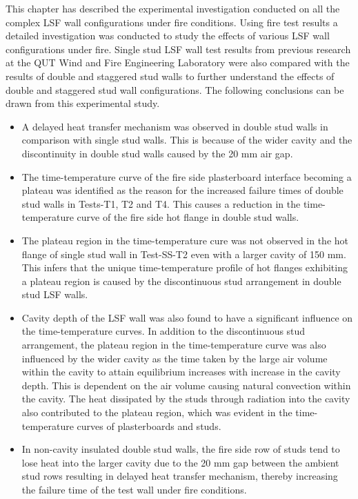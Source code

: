 This chapter has described the experimental investigation conducted on all the complex LSF wall configurations under fire conditions. Using fire test results a detailed investigation was conducted to study the effects of various LSF wall configurations under fire. Single stud LSF wall test results from previous research at the QUT Wind and Fire Engineering Laboratory were also compared with the results of double and staggered stud walls to further understand the effects of double and staggered stud wall configurations. The following conclusions can be drawn from this experimental study.
\begin{itemize}
	\item A delayed heat transfer mechanism was observed in double stud walls in comparison with single stud walls. This is because of the wider cavity and the discontinuity in double stud walls caused by the 20 mm air gap. 
	\item The time-temperature curve of the fire side plasterboard interface becoming a plateau was identified as the reason for the increased failure times of double stud walls in Tests-T1, T2 and T4. This causes a reduction in the time-temperature curve of the fire side hot flange in double stud walls. 
	\item The plateau region in the time-temperature cure was not observed in the hot flange of single stud wall in Test-SS-T2 even with a larger cavity of 150 mm. This infers that the unique time-temperature profile of hot flanges exhibiting a plateau region is caused by the discontinuous stud arrangement in double stud LSF walls.
	\item Cavity depth of the LSF wall was also found to have a significant influence on the time-temperature curves. In addition to the discontinuous stud arrangement, the plateau region in the time-temperature curve was also influenced by the wider cavity as the time taken by the large air volume within the cavity to attain equilibrium increases with increase in the cavity depth. This is dependent on the air volume causing natural convection within the cavity. The heat dissipated by the studs through radiation into the cavity also contributed to the plateau region, which was evident in the time-temperature curves of plasterboards and studs.
	\item In non-cavity insulated double stud walls, the fire side row of studs tend to lose heat into the larger cavity due to the 20 mm gap between the ambient stud rows resulting in delayed heat transfer mechanism, thereby increasing the failure time of the test wall under fire conditions. 

\end{itemize}
